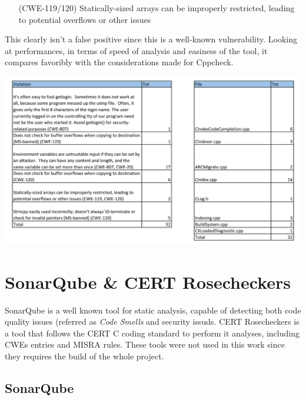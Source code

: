 \begin{itemize}
	\item[(CWE-119/120) ] Statically-sized arrays can be improperly restricted, leading to potential overflows or other issues
\end{itemize}

This clearly isn't a false positive since this is a well-known vulnerability.\newline\newline
Looking at performances, in terms of speed of analysis and easiness of the tool, it compares favoribly with the considerations made for Cppcheck.

\pagebreak

\begin{minipage}{\linewidth}
	\includegraphics[width=\textwidth]{img/Flawfinder_Summary.jpg}
\end{minipage}

\pagebreak


\section{SonarQube \& CERT Rosecheckers}

SonarQube is a well known tool for static analysis, capable of detecting both code quality issues (referred as \textsl{Code Smells} and security issuds.\newline
CERT Rosecheckers is a tool that follows the CERT C coding standard to perform it analyses, including CWEs entries and MISRA rules.\newline\newline
These tools were not used in this work since they requires the build of the whole project.

\subsection{SonarQube}

